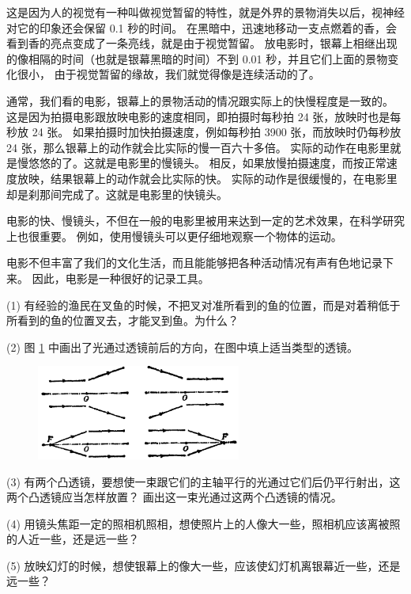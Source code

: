 这是因为人的视觉有一种叫做视觉暂留的特性，就是外界的景物消失以后，视神经对它的印象还会保留 0.1 秒的时间。
在黑暗中，迅速地移动一支点燃着的香，会看到香的亮点变成了一条亮线，就是由于视觉暂留。
放电影时，银幕上相继出现的像相隔的时间（也就是银幕黑暗的时间）不到 0.01 秒，并且它们上面的景物变化很小，
由于视觉暂留的缘故，我们就觉得像是连续活动的了。

通常，我们看的电影，银幕上的景物活动的情况跟实际上的快慢程度是一致的。
这是因为拍摄电影跟放映电影的速度相同，即拍摄时每秒拍 24 张，放映时也是每秒放 24 张。
如果拍摄时加快拍摄速度，例如每秒拍 3900 张，而放映时仍每秒放 24 张，那么银幕上的动作就会比实际的慢一百六十多倍。
实际的动作在电影里就是慢悠悠的了。这就是电影里的慢镜头。
相反，如果放慢拍摄速度，而按正常速度放映，结果银幕上的动作就会比实际的快。
实际的动作是很缓慢的，在电影里却是刹那间完成了。这就是电影里的快镜头。

电影的快、慢镜头，不但在一般的电影里被用来达到一定的艺术效果，在科学研究上也很重要。
例如，使用慢镜头可以更仔细地观察一个物体的运动。

电影不但丰富了我们的文化生活，而且能能够把各种活动情况有声有色地记录下来。
因此，电影是一种很好的记录工具。



\lianxi

(1) 有经验的渔民在叉鱼的时候，不把叉对准所看到的鱼的位置，而是对着稍低于所看到的鱼的位置叉去，才能叉到鱼。为什么？

(2) 图 \ref{fig:1-32} 中画出了光通过透镜前后的方向，在图中填上适当类型的透镜。

\begin{figure}[htbp]
    \centering
    \includegraphics[width=0.6\textwidth]{../pic/czwl2-ch1-32}
    \caption{}\label{fig:1-32}
\end{figure}

(3) 有两个凸透镜，要想使一束跟它们的主轴平行的光通过它们后仍平行射出，这两个凸透镜应当怎样放置？
画出这一束光通过这两个凸透镜的情况。

(4) 用镜头焦距一定的照相机照相，想使照片上的人像大一些，照相机应该离被照的人近一些，还是远一些？

(5) 放映幻灯的时候，想使银幕上的像大一些，应该使幻灯机离银幕近一些，还是远一些？


